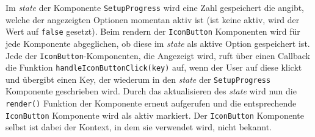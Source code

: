 Im \textit{state} der Komponente \verb|SetupProgress| wird eine Zahl gespeichert die angibt, welche der angezeigten Optionen momentan aktiv ist (ist keine aktiv, wird der Wert auf \verb|false| gesetzt). Beim rendern der \verb|IconButton| Komponenten wird für jede Komponente abgeglichen, ob diese im \textit{state} als aktive Option gespeichert ist. Jede der \verb|IconButton|-Komponenten, die Angezeigt wird, ruft über einen Callback die Funktion \verb|handleIconButtonClick(key)| auf, wenn der User auf diese klickt und übergibt einen Key, der wiederum in den \textit{state} der  \verb|SetupProgress| Komponente geschrieben wird. Durch das aktualisieren des \textit{state} wird nun die \verb|render()| Funktion der Komponente erneut aufgerufen und die entsprechende \verb|IconButton| Komponente wird als aktiv markiert.
Der  \verb|IconButton| Komponente selbst ist dabei der Kontext, in dem sie verwendet wird, nicht bekannt.


